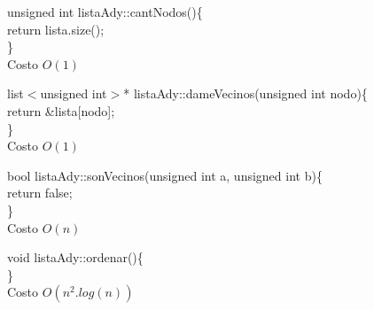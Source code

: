 \documentclass[a4paper]{article}
\begin{document}
\begin{algorithm}[h!]
unsigned int listaAdy::cantNodos()\{\\
	return lista.size();\\
\}\\
Costo $O(1)$
\end{algorithm}

\begin{algorithm}[h!]
list$<$unsigned int$>$* listaAdy::dameVecinos(unsigned int nodo)\{\\
	return \&lista[nodo];\\
\}\\
Costo $O(1)$
\end{algorithm}

\begin{algorithm}[h!]
bool listaAdy::sonVecinos(unsigned int a, unsigned int b)\{\\
	return false;\\
\}\\
Costo $O(n)$
\end{algorithm}

\begin{algorithm}[h!]
void listaAdy::ordenar()\{\\
\}\\
Costo $O(n^2.log(n))$
\end{algorithm}

\newpage












\end{document}

